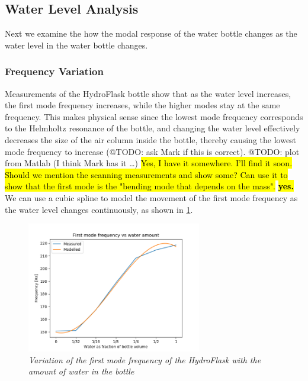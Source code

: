 \documentclass[twoside,a4paper]{article}
\begin{document}
\subsection{Water Level Analysis} \label{sec:water}
%
Next we examine the how the modal response of the water bottle
changes as the water level in the water bottle changes. 
%
\subsubsection{Frequency Variation} \label{sec:water-freq}
%
Measurements of the HydroFlask bottle show that as the water
level increases, the first mode frequency increases, while the
higher modes stay at the same frequency. This makes physical
sense since the lowest mode frequency corresponds to the Helmholtz
resonance of the bottle, and changing the water level
effectively decreases the size of the air column inside the
bottle, thereby causing the lowest mode frequency to increase
(@TODO: ask Mark if this is correct).
\newline\newline
@TODO: plot from Matlab (I think Mark has it \dots)
\hl{Yes, I have it somewhere. I'll find it soon. Should we mention the scanning measurements and show some? Can use it to show that the first mode is the "bending mode that depends on the mass". }\hl{\textbf{yes.}}
\newline\newline
We can use a cubic spline to model the movement of the first
mode frequency as the water level changes continuously, as
shown in \cref{fig:water-mode-freq}.
%
\begin{figure}[!htb]
    \centering
    \includegraphics[width=3in]{../Figures/Water_Freq}
    \caption{\it{Variation of the first mode frequency of the HydroFlask
                with the amount of water in the bottle}}
    \label{fig:water-mode-freq}
\end{figure}
%
\end{document}
